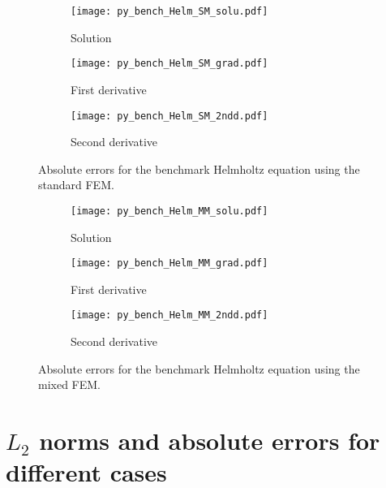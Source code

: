 \documentclass[review,3p]{elsarticle}
\begin{document}
\begin{figure}[!ht]
    \begin{subfigure}{5.5cm}
        \texttt{[image: py\_bench\_Helm\_SM\_solu.pdf]}
        \caption{Solution}
        \label{py_bench_Helm_SM_solu}
    \end{subfigure}
    \hspace{-0.2cm}
    \begin{subfigure}{5.5cm}
        \texttt{[image: py\_bench\_Helm\_SM\_grad.pdf]}
        \caption{First derivative}
        \label{py_bench_Helm_SM_grad}
    \end{subfigure}
    \hspace{-0.2cm}
    \begin{subfigure}{5.5cm}
        \texttt{[image: py\_bench\_Helm\_SM\_2ndd.pdf]}
        \caption{Second derivative}
        \label{py_bench_Helm_SM_2ndd}
    \end{subfigure}
\caption{Absolute errors for the benchmark Helmholtz equation using the standard FEM.}
\label{py_bench_Helm_SM}
\end{figure}

\begin{figure}[!ht]
    \begin{subfigure}{5.5cm}
        \texttt{[image: py\_bench\_Helm\_MM\_solu.pdf]}
        \caption{Solution}
        \label{py_bench_Helm_MM_solu}
    \end{subfigure}
    \hspace{-0.2cm}
    \begin{subfigure}{5.5cm}
        \texttt{[image: py\_bench\_Helm\_MM\_grad.pdf]}
        \caption{First derivative}
        \label{py_bench_Helm_MM_grad}
    \end{subfigure}
    \hspace{-0.2cm}
    \begin{subfigure}{5.5cm}
        \texttt{[image: py\_bench\_Helm\_MM\_2ndd.pdf]}
        \caption{Second derivative}
        \label{py_bench_Helm_MM_2ndd}
    \end{subfigure}
\caption{Absolute errors for the benchmark Helmholtz equation using the mixed FEM.}
\label{py_bench_Helm_MM}
\end{figure}


\newpage
\section{\texorpdfstring{$L_2$}{} norms and absolute errors for different cases}   \label{results_order_of_magnitude_other_cases}
\end{document}
